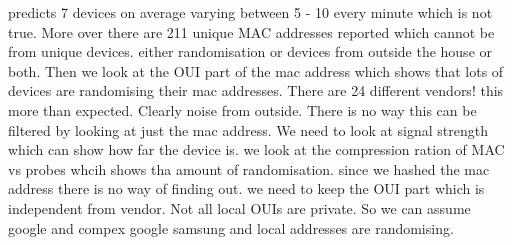 predicts 7 devices on average varying between 5 - 10 every minute which is not true.
More over there are 211 unique MAC addresses reported which cannot be from unique devices. 
either randomisation or devices from outside the house or both.
Then we look at the OUI part of the mac address which shows that lots of devices are randomising their mac addresses.
There are 24 different vendors! this more than expected. Clearly noise from outside. There is no way this can be filtered by looking at just the mac address.
We need to look at signal strength which can show how far the device is.
we look at the compression ration of MAC vs probes whcih shows tha amount of randomisation.
since we hashed the mac address there is no way of finding out. we need to keep the OUI part which is independent from vendor. Not all local OUIs are private.
So we can assume google and 
compex google samsung and local addresses are randomising.

